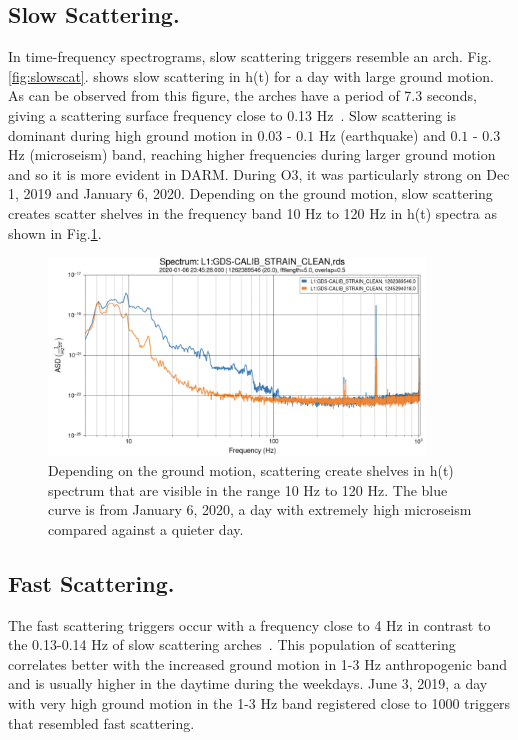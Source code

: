 \documentclass[12pt]{iopart}
\begin{document}
\subsection{Slow Scattering.}
In time-frequency spectrograms, slow scattering triggers resemble an arch.  Fig.\ref{fig:slowscat}. shows slow scattering in h(t) for a day with large ground motion.  As can be observed from this figure, the arches have a period of 7.3 seconds, giving a scattering surface frequency close to 0.13 Hz~\cite{alogsid}. 
Slow scattering is  dominant during high ground motion in $0.03$ - $0.1$ Hz (earthquake) and $0.1$ - $0.3$  Hz (microseism) band, reaching higher frequencies during larger ground motion and so it is more evident in DARM. During O3, it was particularly strong on Dec 1, 2019 and January 6, 2020.  Depending on the ground motion, slow scattering creates scatter shelves in the frequency band 10 Hz to 120 Hz in h(t) spectra as shown in Fig.\ref{fig:scatshelf1}.

\begin{figure}[h]
    \centering
    \includegraphics[width=10cm]{scatshelf2.png}
    \caption{ Depending on the ground motion, scattering create shelves in h(t) spectrum that are visible in the range 10 Hz to 120 Hz. The blue curve is from January 6, 2020, a day with extremely high microseism compared against a quieter day.}
    \label{fig:scatshelf1}
\end{figure}



\subsection{Fast Scattering.}
The fast scattering triggers occur with a frequency close to 4 Hz in contrast to the 0.13-0.14 Hz of slow scattering arches~\cite{alogjosh}. This population of scattering correlates better with the increased ground motion in  1-3 Hz anthropogenic band and is usually higher in the daytime during the weekdays. June 3, 2019, a day with very high ground motion in the 1-3 Hz band registered close to 1000 triggers that resembled fast scattering. 
\end{document}
